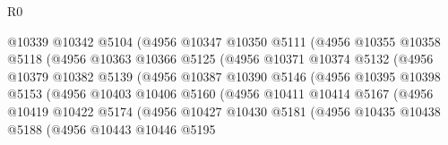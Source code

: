 \begin{lexlean}{R0}
\begin{coremodule}
                            @10339
                            @10342
                            @5104
                            (@4956
                              @10347
                              @10350
                              @5111
                              (@4956
                                @10355
                                @10358
                                @5118
                                (@4956
                                  @10363
                                  @10366
                                  @5125
                                  (@4956
                                    @10371
                                    @10374
                                    @5132
                                    (@4956
                                      @10379
                                      @10382
                                      @5139
                                      (@4956
                                        @10387
                                        @10390
                                        @5146
                                        (@4956
                                          @10395
                                          @10398
                                          @5153
                                          (@4956
                                            @10403
                                            @10406
                                            @5160
                                            (@4956
                                              @10411
                                              @10414
                                              @5167
                                              (@4956
                                                @10419
                                                @10422
                                                @5174
                                                (@4956
                                                  @10427
                                                  @10430
                                                  @5181
                                                  (@4956
                                                    @10435
                                                    @10438
                                                    @5188
                                                    (@4956
                                                      @10443
                                                      @10446
                                                      @5195

\end{coremodule}
\end{lexlean}
